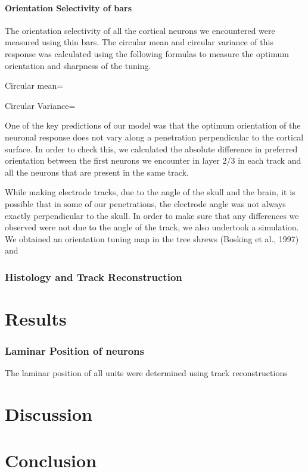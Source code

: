 \paragraph{Orientation Selectivity of bars}

The orientation selectivity of all the cortical neurons we encountered were measured using thin bars. The circular mean and circular variance of this response was calculated using the following formulas to measure the optimum orientation and sharpness of the tuning.

Circular mean=

Circular Variance=

One of the key predictions of our model was that the optimum orientation of the neuronal response does not vary along a penetration perpendicular to the cortical surface. In order to check this, we calculated the absolute difference in preferred orientation between the first neurons we encounter in layer 2/3 in each track and all the neurons that are present in the same track.

While making electrode tracks, due to the angle of the skull and the brain, it is possible that in some of our penetrations, the electrode angle was not always exactly perpendicular to the skull. In order to make sure that any differences we observed were not due to the angle of the track, we also undertook a simulation. We obtained an orientation tuning map in the tree shrews (Bosking et al., 1997) and 
\subsubsection{Histology and Track Reconstruction}


\section{Results}

\subsubsection{Laminar Position of neurons}

The laminar position of all units were determined using track reconstructions   
\section{Discussion}
\section{Conclusion}